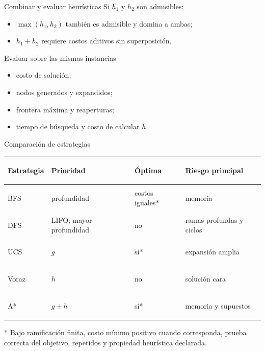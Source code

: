 \documentclass[aspectratio=169,11pt]{beamer}
\begin{document}
\begin{frame}{Combinar y evaluar heurísticas}
  \small
  Si $h_1$ y $h_2$ son admisibles:
  \begin{itemize}
    \item $\max(h_1,h_2)$ también es admisible y domina a ambas;
    \item $h_1+h_2$ requiere costos aditivos sin superposición.
  \end{itemize}
  \begin{block}{Evaluar sobre las mismas instancias}
    \begin{itemize}
      \item costo de solución;
      \item nodos generados y expandidos;
      \item frontera máxima y reaperturas;
      \item tiempo de búsqueda y costo de calcular $h$.
    \end{itemize}
  \end{block}
\end{frame}

\begin{frame}{Comparación de estrategias}
  \small
  \begin{tabularx}{\textwidth}{>{\bfseries\raggedright\arraybackslash}p{}>{\raggedright\arraybackslash}p{}>{\raggedright\arraybackslash}p{}X}
    \toprule
    Estrategia & Prioridad & Óptima & Riesgo principal \\\midrule
    BFS & profundidad & costos iguales* & memoria \\
    DFS & LIFO; mayor profundidad & no & ramas profundas y ciclos \\
    UCS & $g$ & sí* & expansión amplia \\
    Voraz & $h$ & no & solución cara \\
    A* & $g+h$ & sí* & memoria y supuestos \\
    \bottomrule
  \end{tabularx}
  \vfill
  {\scriptsize\alert{* Bajo ramificación finita, costo mínimo positivo cuando corresponda, prueba correcta del objetivo, repetidos y propiedad heurística declarada.}}
\end{frame}
\end{document}
